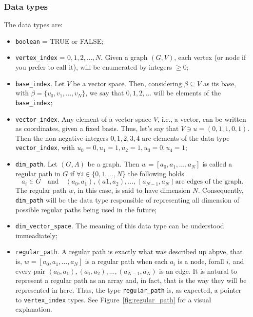 \documentclass[11pt,a4paper]{article}
\begin{document}
\subsubsection{Data types}
The data types are:
\begin{itemize}
	\item \texttt{boolean} = TRUE or FALSE;

	\item \texttt{vertex\_index} = $0, 1, 2, \ldots, N$. Given a graph $(G,V)$, each vertex (or node
		if you prefer to call it), will be enumerated by integers $\geq 0$;

	\item \texttt{base\_index}. Let $V$ be a vector space. Then, considering $\beta \subseteq V$
		as its base, with $\beta = \{v_0, v_1, \ldots, v_N\}$, we say that
		$0, 1, 2, \ldots$ will be elements of the \texttt{base\_index};

	\item \texttt{vector\_index}. Any element of a vector space $V$, i.e., a vector, can be written
		as coordinates, given a fixed basis. Thus, let's say that $V \ni u = (0, 1, 1, 0, 1)$.
		Then the non-negative integers $0, 1, 2, 3, 4$ are elements of the data type 
		\texttt{vector\_index}, with $u_0 = 0, u_1 = 1, u_2 = 1, u_3 = 0, u_4 = 1$;

	\item \texttt{dim\_path}. Let $(G,A)$ be a graph. Then $w = [a_0, a_1, \ldots, a_N]$
		is called a regular path in $G$ if $\forall i \in \{0, 1, \ldots, N\}$ the following holds
		\[
			a_i \in G \quad \text{and} \quad (a_0, a_1), (a1, a_2), \ldots, (a_{N-1}, a_{N}) 
			\text{are edges of the graph}.
		\]
		The regular path $w$, in this case, is said to have dimension $N$. Consequently, \texttt{dim\_path}
		will be the data type responsible of representing all dimension of possible regular paths
		being used in the future;

	\item \texttt{dim\_vector\_space}. The meaning of this data type can be understood immeadiately;

	\item \texttt{regular\_path}. A regular path is exactly what was described up abpve,
		that is, $w = [a_0, a_1, \ldots, a_N]$ is a regular path when each $a_i$ is a node, forall $i$,
		and every pair $(a_0,a_1), (a_1, a_2), \ldots, (a_{N-1}, a_N)$ is an edge. It is natural to represent
		a regular path as an array and, in fact, that is the way they will be represented in
		here. Thus, the type 
		\texttt{regular\_path} is, as expected, a pointer to \texttt{vertex\_index} types.
		See Figure~\ref{fig:regular_path} for a visual explanation.
		\begin{figure}
\end{figure}
\end{itemize}
\end{document}
